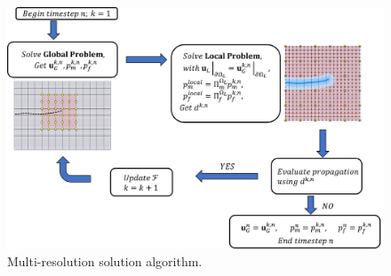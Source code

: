 \begin{figure}[h]
    \centering
    \includegraphics[width=16.5cm]{img/Section2/algorithm_fancy.png}
    \caption{Multi-resolution solution algorithm.}
    \label{fig:solution_algorithm}
\end{figure}
